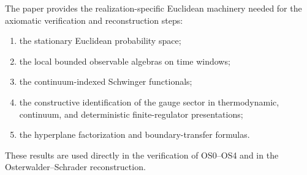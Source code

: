 \documentclass[11pt]{article}
\theoremstyle{definition}
\theoremstyle{remark}
\begin{document}
The paper provides the realization-specific Euclidean machinery needed for the
axiomatic verification and reconstruction steps:
\begin{enumerate}[leftmargin=1.5em]
\item the stationary Euclidean probability space;
\item the local bounded observable algebras on time windows;
\item the continuum-indexed Schwinger functionals;
\item the constructive identification of the gauge sector in thermodynamic,
continuum, and deterministic finite-regulator presentations;
\item the hyperplane factorization and boundary-transfer formulas.
\end{enumerate}
These results are used directly in the verification of OS0--OS4 and in the
Osterwalder--Schrader reconstruction.
\end{document}
